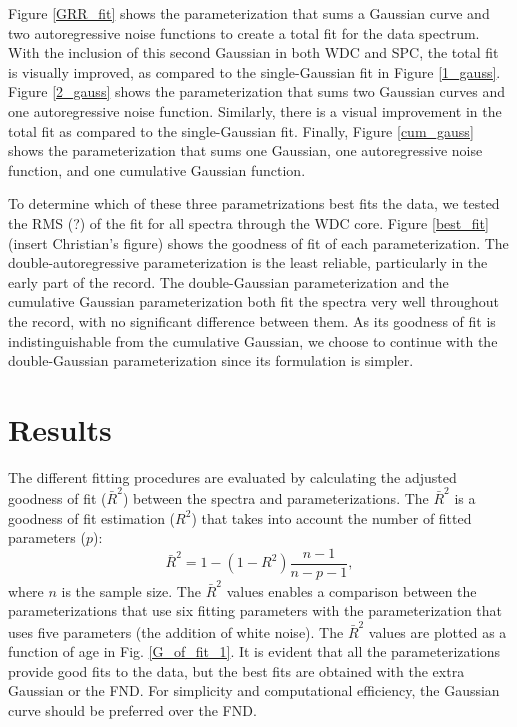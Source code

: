 \documentclass[draft, jgrga]{AGUTeX}
\begin{document}
\begin{article}
Figure \ref{GRR_fit} shows the parameterization that sums a Gaussian curve and two autoregressive noise functions to create a total fit for the data spectrum. With the inclusion of this second Gaussian in both WDC and SPC, the total fit is visually improved, as compared to the single-Gaussian fit in Figure \ref{1_gauss}. Figure \ref{2_gauss} shows the parameterization that sums two Gaussian curves and one autoregressive noise function. Similarly, there is a visual improvement in the total fit as compared to the single-Gaussian fit. Finally, Figure \ref{cum_gauss} shows the parameterization that sums one Gaussian, one autoregressive noise function, and one cumulative Gaussian function.

To determine which of these three parametrizations best fits the data, we tested the RMS (?) of the fit for all spectra through the WDC core. Figure \ref{best_fit} (insert Christian's figure) shows the goodness of fit of each parameterization. The double-autoregressive parameterization is the least reliable, particularly in the early part of the record. The double-Gaussian parameterization and the cumulative Gaussian parameterization both fit the spectra very well throughout the record, with no significant difference between them. As its goodness of fit is indistinguishable from the cumulative Gaussian, we choose to continue with the double-Gaussian parameterization since its formulation is simpler.


\section{Results}
The different fitting procedures are evaluated by calculating the adjusted goodness of fit ($\bar{R}^2$) between the spectra and parameterizations. The $\bar{R}^2$ is a goodness of fit estimation ($R^2$) that takes into account the number of fitted parameters ($p$):
\begin{equation}
\bar{R}^2 = 1 - (1 -R^2) \frac{n - 1}{n - p - 1},
\end{equation}
where $n$ is the sample size.
The $\bar{R}^2$ values enables a comparison between the parameterizations that use six fitting parameters with
the parameterization that uses five parameters (the addition of white noise).
The $\bar{R}^2$ values are plotted as a function of age in Fig. \ref{G_of_fit_1}.
It is evident that all the parameterizations provide good fits to the data,
but the best fits are obtained with the extra Gaussian or the FND.
For simplicity and computational efficiency, the Gaussian curve should be preferred over the FND.



\end{article}
\end{document}
